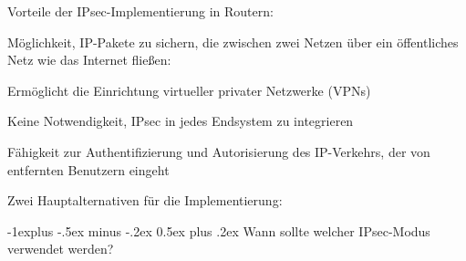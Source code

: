 \documentclass[a4paper]{article}
\makeatletter
\renewcommand{\subsection}{\@startsection{subsection}{2}{0mm}%
 {-1explus -.5ex minus -.2ex}%
 {0.5ex plus .2ex}%
 {\normalfont\normalsize\bfseries}}
\makeatother
\begin{document}
\begin{multicols}{3}
      \begin{itemize*}
            \item Vorteile der IPsec-Implementierung in Routern:
            \begin{itemize*}
                  \item Möglichkeit, IP-Pakete zu sichern, die zwischen zwei Netzen über ein öffentliches Netz wie das Internet fließen:
                  \begin{itemize*} \item Ermöglicht die Einrichtung virtueller privater Netzwerke (VPNs) \item Keine Notwendigkeit, IPsec in jedes Endsystem zu integrieren \end{itemize*}
                  \item Fähigkeit zur Authentifizierung und Autorisierung des IP-Verkehrs, der von entfernten Benutzern eingeht
            \end{itemize*}
            \item Zwei Hauptalternativen für die Implementierung:
      \end{itemize*}


      \subsection{Wann sollte welcher IPsec-Modus verwendet
            werden?}


\end{multicols}
\end{document}
